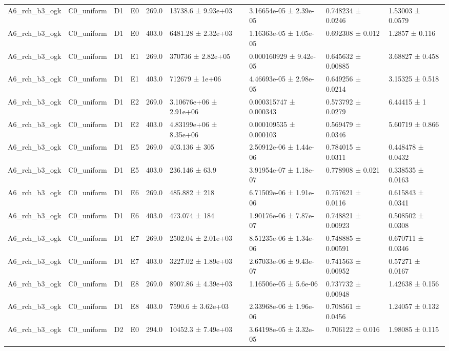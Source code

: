 \begin{table}
\begin{tabular}{lllllllll}
A6\_rch\_b3\_ogk & C0\_uniform & D1 & E0 & 269.0 & 13738.6 ± 9.93e+03 & 3.16654e-05 ± 2.39e-05 & 0.748234 ± 0.0246 & 1.53003 ± 0.0579 \\
A6\_rch\_b3\_ogk & C0\_uniform & D1 & E0 & 403.0 & 6481.28 ± 2.32e+03 & 1.16363e-05 ± 1.05e-05 & 0.692308 ± 0.012 & 1.2857 ± 0.116 \\
A6\_rch\_b3\_ogk & C0\_uniform & D1 & E1 & 269.0 & 370736 ± 2.82e+05 & 0.000160929 ± 9.42e-05 & 0.645632 ± 0.00885 & 3.68827 ± 0.458 \\
A6\_rch\_b3\_ogk & C0\_uniform & D1 & E1 & 403.0 & 712679 ± 1e+06 & 4.46693e-05 ± 2.98e-05 & 0.649256 ± 0.0214 & 3.15325 ± 0.518 \\
A6\_rch\_b3\_ogk & C0\_uniform & D1 & E2 & 269.0 & 3.10676e+06 ± 2.91e+06 & 0.000315747 ± 0.000343 & 0.573792 ± 0.0279 & 6.44415 ± 1 \\
A6\_rch\_b3\_ogk & C0\_uniform & D1 & E2 & 403.0 & 4.83199e+06 ± 8.35e+06 & 0.000109535 ± 0.000103 & 0.569479 ± 0.0346 & 5.60719 ± 0.866 \\
A6\_rch\_b3\_ogk & C0\_uniform & D1 & E5 & 269.0 & 403.136 ± 305 & 2.50912e-06 ± 1.44e-06 & 0.784015 ± 0.0311 & 0.448478 ± 0.0432 \\
A6\_rch\_b3\_ogk & C0\_uniform & D1 & E5 & 403.0 & 236.146 ± 63.9 & 3.91954e-07 ± 1.18e-07 & 0.778908 ± 0.021 & 0.338535 ± 0.0163 \\
A6\_rch\_b3\_ogk & C0\_uniform & D1 & E6 & 269.0 & 485.882 ± 218 & 6.71509e-06 ± 1.91e-06 & 0.757621 ± 0.0116 & 0.615843 ± 0.0341 \\
A6\_rch\_b3\_ogk & C0\_uniform & D1 & E6 & 403.0 & 473.074 ± 184 & 1.90176e-06 ± 7.87e-07 & 0.748821 ± 0.00923 & 0.508502 ± 0.0308 \\
A6\_rch\_b3\_ogk & C0\_uniform & D1 & E7 & 269.0 & 2502.04 ± 2.01e+03 & 8.51235e-06 ± 1.34e-06 & 0.748885 ± 0.00591 & 0.670711 ± 0.0346 \\
A6\_rch\_b3\_ogk & C0\_uniform & D1 & E7 & 403.0 & 3227.02 ± 1.89e+03 & 2.67033e-06 ± 9.43e-07 & 0.741563 ± 0.00952 & 0.57271 ± 0.0167 \\
A6\_rch\_b3\_ogk & C0\_uniform & D1 & E8 & 269.0 & 8907.86 ± 4.39e+03 & 1.16506e-05 ± 5.6e-06 & 0.737732 ± 0.00948 & 1.42638 ± 0.156 \\
A6\_rch\_b3\_ogk & C0\_uniform & D1 & E8 & 403.0 & 7590.6 ± 3.62e+03 & 2.33968e-06 ± 1.96e-06 & 0.708561 ± 0.0456 & 1.24057 ± 0.132 \\
A6\_rch\_b3\_ogk & C0\_uniform & D2 & E0 & 294.0 & 10452.3 ± 7.49e+03 & 3.64198e-05 ± 3.32e-05 & 0.706122 ± 0.016 & 1.98085 ± 0.115 \\

\end{tabular}
\end{table}
